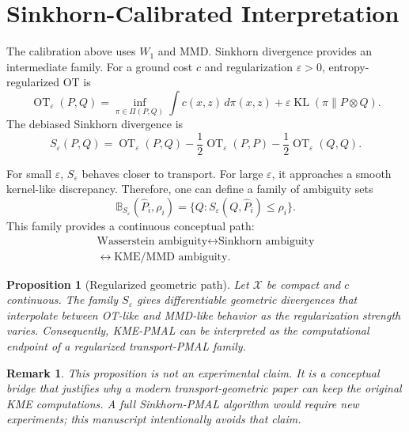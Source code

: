 \documentclass[10pt,journal]{IEEEtran}
\newtheorem{proposition}{Proposition}
\newtheorem{remark}{Remark}
\DeclareMathOperator{\OT}{OT}
\DeclareMathOperator{\KL}{KL}
\newcommand{\Xcal}{\mathcal{X}}
\newcommand{\eps}{\varepsilon}
\newcommand{\wh}{\widehat}
\newcommand{\ball}{\mathbb{B}}
\begin{document}
\section{Sinkhorn-Calibrated Interpretation}
\label{sec:sinkhorn}

The calibration above uses $W_1$ and MMD. Sinkhorn divergence provides an intermediate family. For a ground cost $c$ and regularization $\eps>0$, entropy-regularized OT is
\begin{equation}
    \OT_\eps(P,Q)=\inf_{\pi\in\Pi(P,Q)}\int c(x,z)\,d\pi(x,z)+\eps\KL(\pi\|P\otimes Q).
\end{equation}
The debiased Sinkhorn divergence is
\begin{equation}
    S_\eps(P,Q)=\OT_\eps(P,Q)-\frac{1}{2}\OT_\eps(P,P)-\frac{1}{2}\OT_\eps(Q,Q).
\end{equation}

For small $\eps$, $S_\eps$ behaves closer to transport. For large $\eps$, it approaches a smooth kernel-like discrepancy. Therefore, one can define a family of ambiguity sets
\begin{equation}
    \ball_{S_\eps}(\wh P_i,\rho_i)=\{Q:S_\eps(Q,\wh P_i)\le \rho_i\}.
\end{equation}
This family provides a continuous conceptual path:
\begin{equation}
\begin{array}{c}
\text{Wasserstein ambiguity}
\longleftrightarrow
\text{Sinkhorn ambiguity}\\[0.15em]
\longleftrightarrow
\text{KME/MMD ambiguity}.
\end{array}
\end{equation}

\begin{proposition}[Regularized geometric path]
\label{prop:path}
Let $\Xcal$ be compact and $c$ continuous. The family $S_\eps$ gives differentiable geometric divergences that interpolate between OT-like and MMD-like behavior as the regularization strength varies. Consequently, KME-PMAL can be interpreted as the computational endpoint of a regularized transport-PMAL family.
\end{proposition}

\begin{remark}
This proposition is not an experimental claim. It is a conceptual bridge that justifies why a modern transport-geometric paper can keep the original KME computations. A full Sinkhorn-PMAL algorithm would require new experiments; this manuscript intentionally avoids that claim.
\end{remark}
\end{document}
